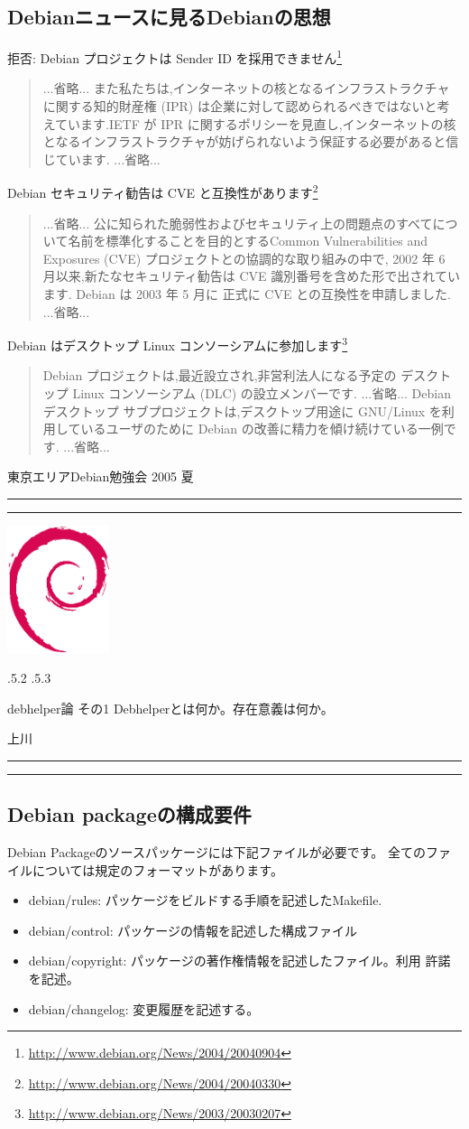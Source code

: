\documentclass[mingoth,a4paper]{jsarticle}
\makeatletter
\renewcommand{\section}{\@startsection{section}{1}{\z@}%
    {\Cvs \@plus.5\Cdp \@minus.2\Cdp}%
    {.5\Cvs \@plus.3\Cdp}%
    {\normalfont\Large\headfont\raggedright\centering}} %
\newcommand{\dancersection}[2]{%
\newpage
東京エリアDebian勉強会 2005 夏
\hrule
\vspace{0.5mm}
\hrule
\hfill{}\includegraphics[width=3cm]{image200502/openlogo-nd.eps}\\
\vspace{-4cm}
\begin{center}
  \section{#1}
\end{center}
\hfill{}#2\hspace{3cm}\space\\
\hrule
\hrule
\vspace{1cm}
}
\makeatother
\begin{document}
\subsection{Debianニュースに見るDebianの思想}
拒否: Debian プロジェクトは Sender ID を採用できません\footnote{\url{http://www.debian.org/News/2004/20040904}}
\begin{quote}
...省略...
また私たちは,インターネットの核となるインフラストラクチャに関する知的財産権 (IPR) は企業に対して認められるべきではないと考えています.IETF が IPR に関するポリシーを見直し,インターネットの核となるインフラストラクチャが妨げられないよう保証する必要があると信じています.
...省略...
\end{quote}
Debian セキュリティ勧告は CVE と互換性があります\footnote{\url{http://www.debian.org/News/2004/20040330}}
\begin{quote}
...省略...
公に知られた脆弱性およびセキュリティ上の問題点のすべてについて名前を標準化することを目的とするCommon Vulnerabilities and Exposures (CVE) プロジェクトとの協調的な取り組みの中で, 2002 年 6 月以来,新たなセキュリティ勧告は CVE 識別番号を含めた形で出されています. Debian は 2003 年 5 月に 正式に CVE との互換性を申請しました.
...省略...
\end{quote}
Debian はデスクトップ Linux コンソーシアムに参加します\footnote{\url{http://www.debian.org/News/2003/20030207}}
\begin{quote}
Debian プロジェクトは,最近設立され,非営利法人になる予定の デスクトップ Linux コンソーシアム (DLC) の設立メンバーです.
...省略...
Debian デスクトップ サブプロジェクトは,デスクトップ用途に GNU/Linux を利用しているユーザのために Debian の改善に精力を傾け続けている一例です.
...省略...
\end{quote}

\dancersection{debhelper論 その1 Debhelperとは何か。存在意義は何か。}{上川}

\subsection{Debian packageの構成要件}


Debian Packageのソースパッケージには下記ファイルが必要です。
全てのファイルについては規定のフォーマットがあります。

\begin{itemize}
 \item debian/rules: パッケージをビルドする手順を記述したMakefile.
 \item debian/control: パッケージの情報を記述した構成ファイル
 \item debian/copyright: パッケージの著作権情報を記述したファイル。利用
       許諾を記述。
 \item debian/changelog: 変更履歴を記述する。
\end{itemize}
\end{document}
